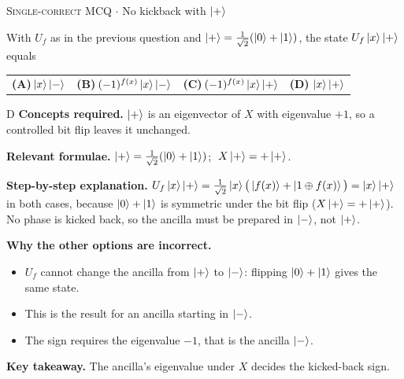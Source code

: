 \documentclass[11pt,a4paper]{article}
\newcommand{\optlabel}[1]{\textbf{(#1)}}
\newcommand{\correctlabel}[1]{\textcolor{okgreen}{\textbf{(#1)}\,\ding{51}}}
\newenvironment{qitem}[1]{\begin{list}{}{\setlength{\leftmargin}{3.3em}\setlength{\labelwidth}{3.1em}%
  \setlength{\labelsep}{0.2em}\setlength{\topsep}{3pt}\setlength{\parsep}{3pt}}\item[\textbf{Q.#1}\hfill]}{\end{list}}
\newcommand{\qsep}{\par\vspace{2pt}{\color{black!15}\hrule}\vspace{4pt}}
\newcommand{\qmeta}[2]{{\footnotesize\color{black!60}\textsc{#1} \;$\cdot$\; #2}\par}
\begin{document}
\begin{qitem}{25}
\qmeta{Single-correct MCQ}{No kickback with $\ket{+}$}
With $U_f$ as in the previous question and $\ket{+} = \frac{1}{\sqrt2}(\ket0 + \ket1)$, the state $U_f\ket{x}\ket{+}$ equals
\par\smallskip\noindent\begin{tabularx}{\linewidth}{@{}*{4}{L}@{}}
\optlabel{A}\,$\ket{x}\ket{-}$ & \optlabel{B}\,$(-1)^{f(x)}\ket{x}\ket{-}$ & \optlabel{C}\,$(-1)^{f(x)}\ket{x}\ket{+}$ & \correctlabel{D}\,$\ket{x}\ket{+}$
\end{tabularx}
\end{qitem}
\begin{solbox}{D}
\textbf{\color{brand}Concepts required.} $\ket{+}$ is an eigenvector of $X$ with eigenvalue $+1$, so a controlled bit flip leaves it unchanged.

\textbf{\color{brand}Relevant formulae.} $\ket{+} = \frac{1}{\sqrt2}(\ket0 + \ket1)$; $\;X\ket{+} = +\ket{+}$.

\textbf{\color{brand}Step-by-step explanation.} $U_f\ket{x}\ket{+} = \frac{1}{\sqrt2}\ket{x}\big(\ket{f(x)} + \ket{1 \oplus f(x)}\big) = \ket{x}\ket{+}$ in both cases, because $\ket0 + \ket1$ is symmetric under the bit flip
($X\ket{+} = +\ket{+}$). No phase is kicked back, so the ancilla must be prepared in $\ket{-}$, not $\ket{+}$.

\textbf{\color{brand}Why the other options are incorrect.}
\begin{itemize}[leftmargin=2.4em, itemsep=1pt, topsep=2pt]
\item[\textbf{(A)}] $U_f$ cannot change the ancilla from $\ket{+}$ to $\ket{-}$: flipping $\ket0 + \ket1$ gives the same state.
\item[\textbf{(B)}] This is the result for an ancilla starting in $\ket{-}$.
\item[\textbf{(C)}] The sign requires the eigenvalue $-1$, that is the ancilla $\ket{-}$.
\end{itemize}
\textbf{\color{brand}Key takeaway.} The ancilla's eigenvalue under $X$ decides the kicked-back sign.
\end{solbox}
\qsep
\end{document}
